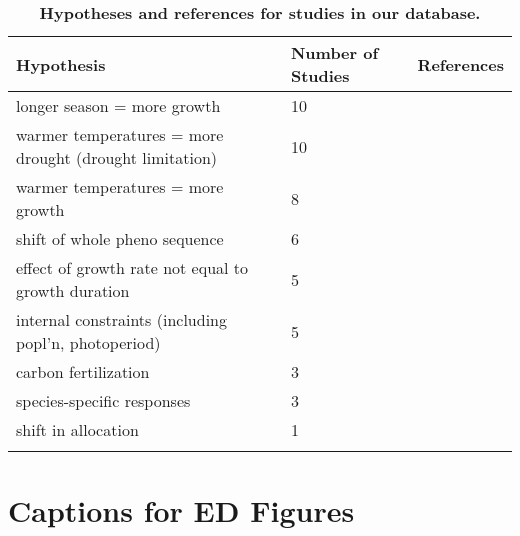 \documentclass[11pt]{article}
\begin{document}
\begingroup\footnotesize
\begin{longtable}{p{}p{}p{}}
\caption{\textbf{Hypotheses and references for studies in our database.}} \\ 
  \hline
Hypothesis & Number of Studies & References \\ 
  \hline \endhead  \hline
longer season = more growth &  10 & \citep{camarero2022decoupled,chen2000,vcufar2015variations,delpierre2017tree,de2022temperature,gao2022earlier,grossiord2022warming,keenan2014net,silvestro2023longer,wheeler2016snow} \\ 
  warmer temperatures = more drought (drought limitation) &  10 & \citep{brand2022,buermann2018widespread,camarero2022decoupled,de2022temperature,drew2018growth,eckes2021,etzold2022number,kolavr2016response,oddi2022contrasting,zhu2021different} \\ 
  warmer temperatures = more growth &   8 & \citep{camarero2022decoupled,dow2022warm,finzi2020,moser2010timing,richardson2010influence,soolanayakanahally2013timing,stridbeck2022,zhang2021drought} \\ 
  shift of whole pheno sequence &   6 & \citep{delpierre2017tree,de2022temperature,richardson2010influence,soolanayakanahally2013timing,zani2020increased,zohner2020interactive} \\ 
  effect of growth rate not equal to growth duration &   5 & \citep{cuny2012life,de2022temperature,francon2020,michelot2012comparing,ren2019} \\ 
  internal constraints (including popl'n, photoperiod) &   5 & \citep{moser2010timing,sebazc2020,soolanayakanahally2013timing,vitasse2009altitudinal,zohner2023effect} \\ 
  carbon fertilization &   3 & \citep{chen1999effects,finzi2020,oddi2022contrasting} \\ 
  species-specific responses &   3 & \citep{cuny2012life,etzold2022number,michelot2012comparing} \\ 
  shift in allocation &   1 & \citep{mckown2016impacts} \\ 
  \hline
\label{tab:ref}
\end{longtable}
\endgroup

\iffalse
\section*{Captions for ED Figures} 
\end{document}
